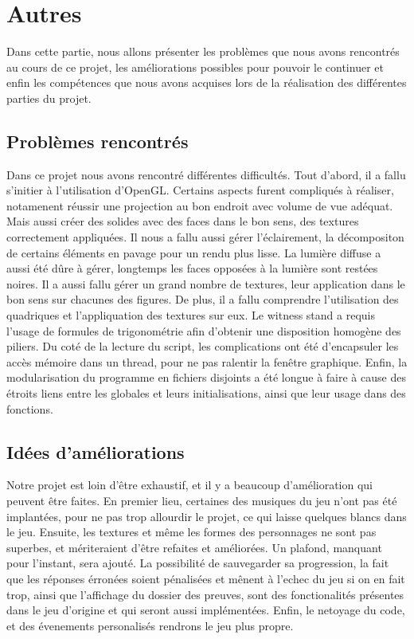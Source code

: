 \section{Autres}
	
	Dans cette partie, nous allons présenter les problèmes que nous avons rencontrés au cours de ce projet, les améliorations possibles pour pouvoir le continuer et enfin les compétences que nous avons acquises lors de la réalisation des différentes parties du projet.
	
\subsection{Problèmes rencontrés}
	Dans ce projet nous avons rencontré différentes difficultés. Tout d'abord, il a fallu s'initier à l'utilisation d'OpenGL. Certains aspects furent compliqués à réaliser, notamenent réussir une projection au bon endroit avec volume de vue adéquat. Mais aussi créer des solides avec des faces dans le bon sens, des textures correctement appliquées. Il nous a fallu aussi gérer l'éclairement, la décompositon de certains éléments en pavage pour un rendu plus lisse. La lumière diffuse a aussi été dûre à gérer, longtemps les faces opposées à la lumière sont restées noires. Il a aussi fallu gérer un grand nombre de textures, leur application dans le bon sens sur chacunes des figures. De plus, il a fallu comprendre l'utilisation des quadriques et l'appliquation des textures sur eux. Le witness stand a requis l'usage de formules de trigonométrie afin d'obtenir une disposition homogène des piliers.
	Du coté de la lecture du script, les complications ont été d'encapsuler les accès mémoire dans un thread, pour ne pas ralentir la fenêtre graphique.
	 Enfin, la modularisation du programme en fichiers disjoints a été longue à faire à cause des étroits liens entre les globales et leurs initialisations, ainsi que leur usage dans des fonctions.
\subsection{Idées d'améliorations}
	Notre projet est loin d'être exhaustif, et il y a beaucoup d'amélioration qui peuvent être faites. En premier lieu, certaines des musiques du jeu n'ont pas été implantées, pour ne pas trop allourdir le projet, ce qui laisse quelques blancs dans le jeu. Ensuite, les textures et même les formes des personnages ne sont pas superbes, et mériteraient d'être refaites et améliorées. Un plafond, manquant pour l'instant, sera ajouté. La possibilité de sauvegarder sa progression, la fait que les réponses érronées soient pénalisées et mênent à l'echec du jeu si on en fait trop, ainsi que l'affichage du dossier des preuves, sont des fonctionalités présentes dans le jeu d'origine et qui seront aussi implémentées. Enfin, le netoyage du code, et des évenements personalisés rendrons le jeu plus propre.


